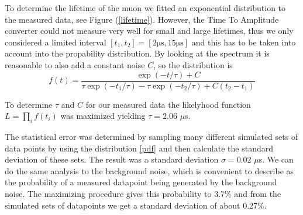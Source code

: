 \documentclass[10pt,twocolumn]{article}
\begin{document}
To determine the lifetime of the muon we fitted an exponential distribution to the measured data, see Figure (\ref{lifetime}). However, the Time To Amplitude converter could not measure very well for small and large lifetimes, thus we only considered a limited interval $[t_1,t_2]=[2 \mathrm{\mu s},15  \mathrm{\mu s}]$ and this has to be taken into account into the propability distribution. By looking at the spectrum it is reasonable to also add a constant noise $C$, so the distribution is
\begin{equation}
f(t)=\frac{\exp{(-t/\tau)}+C}{\tau\exp{(-t_1/\tau)}-\tau\exp{(-t_2/\tau)}+C(t_2-t_1)}\label{pdf}
\end{equation}

To determine $\tau$ and $C$ for our measured data the likelyhood function $L=\prod_i f(t_i)$ was maximized yielding $\tau=2.06$ $\mu$s. \newline

The statistical error was determined by sampling many different simulated sets of data points by using the distribution \eqref{pdf} and then calculate the standard deviation of these sets. The result was a standard deviation $\sigma=0.02$ $\mu$s. We can do the same analysis to the background noise, which is convenient to describe as the probability of a measured datapoint being generated by the background noise. The maximizing procedure gives this probability to 3.7\% and from the simulated sets of datapoints we get a standard deviation of about 0.27\%. %
\newline
\end{document}
